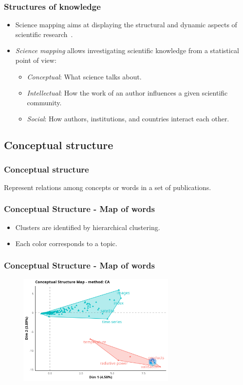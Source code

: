 \documentclass[aspectratio=169]{beamer}
\begin{document}
\begin{frame}
	\frametitle{Structures of knowledge}
	\begin{itemize}
		\item Science mapping aims at displaying the structural and dynamic aspects of
		      scientific research~\cite{borner2003}.
		\item \emph{Science mapping} allows investigating scientific knowledge from a
		      statistical point of view:
		      \begin{itemize}
			      \item \emph{Conceptual}: What science talks about.
			      \item \emph{Intellectual}: How the work of an author influences a given
			            scientific community.
			      \item \emph{Social}: How authors, institutions, and countries interact each
			            other.
		      \end{itemize}
	\end{itemize}
\end{frame}



\subsection{Conceptual structure}

\begin{frame}
	\frametitle{Conceptual structure}
	Represent relations among concepts or words in a set of publications.
\end{frame}

\begin{frame}
	\frametitle{Conceptual Structure - Map of words}
	\begin{itemize}
		\item Clusters are identified by hierarchical clustering.
		\item Each color corresponds to a topic.
	\end{itemize}
\end{frame}

\begin{frame}
	\frametitle{Conceptual Structure - Map of words}
	\begin{figure}
		\centering
		\includegraphics[width=0.7\textwidth]{figures/con_stru_map.png}
	\end{figure}
\end{frame}
\end{document}
